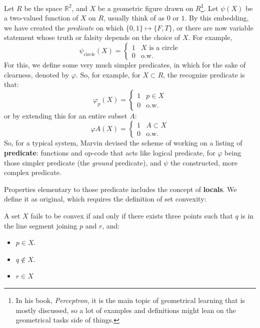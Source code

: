 Let $R$ be the space $\mathbb{R}^{2}$, and $X$ be a geometric figure drawn on $R$\footnote{In his book, \textit{Perceptron}, it is the main topic of geometrical learning that is mostly discussed, so a lot of examples and definitions might lean on the geometrical tasks side of things.}. Let $\psi(X)$ be a two-valued function of $X$ on $R$, usually think of as $0$ or $1$. By this embedding, we have created the \textit{predicate} on which $\{0,1\}\mapsto \{F,T\}$, or there are now variable statement whose truth or falsity depends on the choice of $X$. For example, 
\begin{equation*}
    \psi_{\text{circle}} (X) = \begin{cases}
        1 & X \text{ is a circle}\\
        0 & \text{o.w.}
    \end{cases}
\end{equation*} 
For this, we define some very much simpler predicates, in which for the sake of clearness, denoted by $\varphi$. So, for example, for $X\subset R$, the recognize predicate is that: 
\begin{equation*}
    \varphi_{p}(X) = \begin{cases}
        1 & p \in X\\
        0 & \text{o.w.}
    \end{cases}
\end{equation*}
or by extending this for an entire subset $A$: \begin{equation*}
    \varphi{A}(X) = \begin{cases}
        1 & A \subset X\\
        0 & \text{o.w.}
    \end{cases}
\end{equation*}
So, for a typical system, Marvin devised the scheme of working on a listing of \textbf{predicate}: functions and op-code that acts like logical predicate, for $\varphi$ being those simpler predicate (the \textit{ground} predicate), and $\psi$ the constructed, more complex predicate. 

Properties elementary to those predicate includes the concept of \textbf{locals}. We define it as original, which requires the definition of set convexity: 
\begin{definition}
    A set $X$ fails to be convex if and only if there exists three points such that $q$ is in the line segment joining $p$ and $r$, and: 
    \begin{itemize}[noitemsep,topsep=0pt]
        \item $p\in X$. 
        \item $q\not\in X$. 
        \item $r\in X$
    \end{itemize}
\end{definition}

